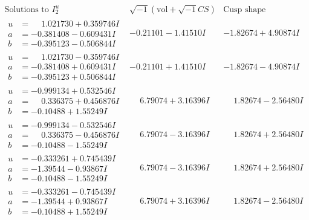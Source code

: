 \documentclass[1p]{elsarticle_modified}
\theoremstyle{definition}
\newcommand{\I}{\sqrt{-1}}
\begin{document}
$$\begin{array}{c|c|c}  
\text{Solutions to }I^u_{2}& \I (\text{vol} + \sqrt{-1}CS) & \text{Cusp shape}\\
 \hline 
\begin{aligned}
u &= \phantom{-}1.021730 + 0.359746 I \\
a &= -0.381408 - 0.609431 I \\
b &= -0.395123 - 0.506844 I\end{aligned}
 & -0.21101 - 1.41510 I & -1.82674 + 4.90874 I \\ \hline\begin{aligned}
u &= \phantom{-}1.021730 - 0.359746 I \\
a &= -0.381408 + 0.609431 I \\
b &= -0.395123 + 0.506844 I\end{aligned}
 & -0.21101 + 1.41510 I & -1.82674 - 4.90874 I \\ \hline\begin{aligned}
u &= -0.999134 + 0.532546 I \\
a &= \phantom{-}0.336375 + 0.456876 I \\
b &= -0.10488 + 1.55249 I\end{aligned}
 & \phantom{-}6.79074 + 3.16396 I & \phantom{-}1.82674 - 2.56480 I \\ \hline\begin{aligned}
u &= -0.999134 - 0.532546 I \\
a &= \phantom{-}0.336375 - 0.456876 I \\
b &= -0.10488 - 1.55249 I\end{aligned}
 & \phantom{-}6.79074 - 3.16396 I & \phantom{-}1.82674 + 2.56480 I \\ \hline\begin{aligned}
u &= -0.333261 + 0.745439 I \\
a &= -1.39544 - 0.93867 I \\
b &= -0.10488 - 1.55249 I\end{aligned}
 & \phantom{-}6.79074 - 3.16396 I & \phantom{-}1.82674 + 2.56480 I \\ \hline\begin{aligned}
u &= -0.333261 - 0.745439 I \\
a &= -1.39544 + 0.93867 I \\
b &= -0.10488 + 1.55249 I\end{aligned}
 & \phantom{-}6.79074 + 3.16396 I & \phantom{-}1.82674 - 2.56480 I \\ \hline\begin{aligned}

\end{aligned}
\end{array}$$
\end{document}
